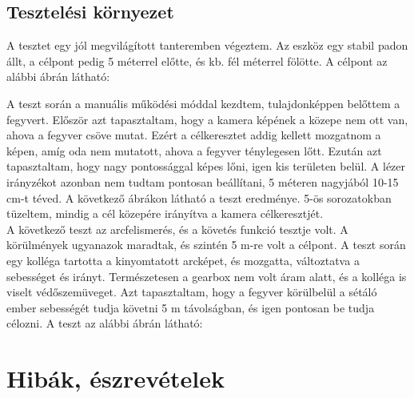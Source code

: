 \documentclass[12pt,a4paper]{article}
\begin{document}
\subsection{Tesztelési környezet}
A tesztet egy jól megvilágított tanteremben végeztem. Az eszköz egy stabil padon állt, a célpont pedig 5 méterrel előtte, és kb. fél méterrel fölötte. A célpont az alábbi ábrán látható:

A teszt során a manuális működési móddal kezdtem, tulajdonképpen belőttem a fegyvert. Először azt tapasztaltam, hogy a kamera képének a közepe nem ott van, ahova a fegyver csöve mutat. Ezért a célkeresztet addig kellett mozgatnom a képen, amíg oda nem mutatott, ahova a fegyver ténylegesen lőtt. Ezután azt tapasztaltam, hogy nagy pontossággal képes lőni, igen kis területen belül. A lézer irányzékot azonban nem tudtam pontosan beállítani, 5 méteren nagyjából 10-15 cm-t téved. A következő ábrákon látható a teszt eredménye. 5-ös sorozatokban tüzeltem, mindig a cél közepére irányítva a kamera célkeresztjét. \\

A következő teszt az arcfelismerés, és a követés funkció tesztje volt. A körülmények ugyanazok maradtak, és szintén 5 m-re volt a célpont. A teszt során egy kolléga tartotta a kinyomtatott arcképet, és mozgatta, változtatva a sebességet és irányt. Természetesen a gearbox nem volt áram alatt, és a kolléga is viselt védőszemüveget. Azt tapasztaltam, hogy a fegyver körülbelül a sétáló ember sebességét tudja követni 5 m távolságban, és igen pontosan be tudja célozni. A teszt az alábbi ábrán látható:
\section{Hibák, észrevételek}
\end{document}
